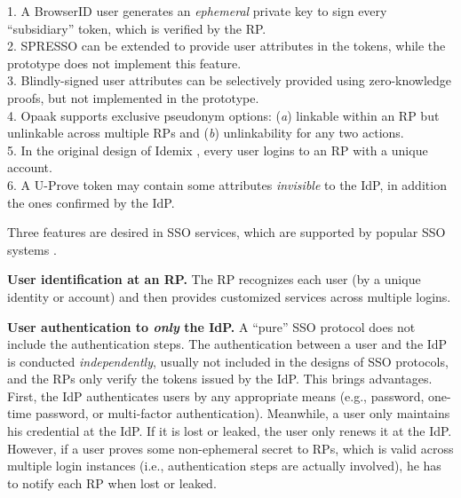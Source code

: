 \begin{table}[tb]
\flushleft
{\footnotesize
1. A BrowserID user generates an \emph{ephemeral} private key to sign every ``subsidiary'' token,
 which is verified by the RP.\\
2. SPRESSO can be extended to provide user attributes in the tokens, while the prototype does not implement this feature.\\
3. Blindly-signed user attributes can be selectively provided using zero-knowledge proofs,
    but not implemented in the prototype.\\
4. Opaak supports exclusive pseudonym options: (\emph{a}) linkable within an RP but unlinkable across multiple RPs and (\emph{b}) unlinkability for any two actions.\\
5. In the original design of Idemix \cite{idemix}, every user logins to an RP with a unique account.\\
6. A U-Prove token may contain some attributes \emph{invisible} to the IdP, in addition the ones confirmed by the IdP.}
\end{table}

Three features are desired in SSO services, which are supported by popular SSO systems \cite{NIST2017draft,OpenIDConnect,rfc6749,SAML,SAMLIdentifier}.


\noindent \textbf{User identification at an RP.}
The RP recognizes each user (by a unique identity or account) and then provides customized services across multiple logins.


\noindent\textbf{User authentication to {\em only} the IdP.}
A ``pure'' SSO protocol \cite{OpenIDConnect,rfc6749,SAML} does not include the authentication steps. The authentication between a user and the IdP is conducted \emph{independently},
    usually not included in the designs of SSO protocols,
and the RPs only verify the tokens issued by the IdP.
This brings advantages. First, the IdP authenticates users by any appropriate means (e.g., password,
one-time password, or multi-factor authentication).
Meanwhile, a user only maintains his credential at the IdP. If it is lost or leaked, the user only renews it at the IdP. However, if a user proves some non-ephemeral secret to RPs, which is valid across multiple login instances (i.e., authentication steps are actually involved), he has to notify each RP when lost or leaked. %

